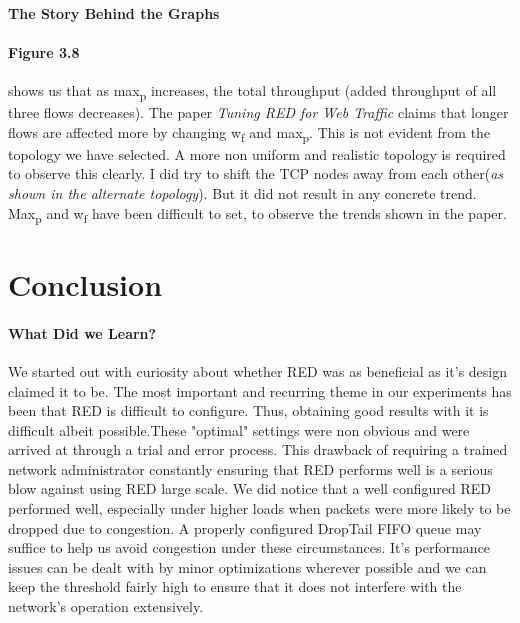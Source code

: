 \documentclass[paper=a4, fontsize=12pt]{scrartcl} %
\numberwithin{equation}{section} %
\numberwithin{figure}{section} %
\numberwithin{table}{section} %
\begin{document}
\paragraph{The Story Behind the Graphs} 
\paragraph{Figure 3.8}
\hspace{-10pt} shows us that as max\textsubscript{p} increases, the total throughput (added throughput of all three flows decreases). The paper \emph{Tuning RED for Web Traffic} claims that longer flows are affected more by changing w\textsubscript{f} and max\textsubscript{p}. This is not evident from the topology we have selected. A more non uniform and realistic topology is required to observe this clearly. I did try to shift the TCP nodes away from each other(\emph{as shown in the alternate topology}). But it did not result in any concrete trend. Max\textsubscript{p} and w\textsubscript{f} have been difficult to set, to observe the trends shown in the paper.

 \newpage
\section{Conclusion}

\paragraph{What Did we Learn?\newline\newline}
\hspace{-10pt}
We started out with curiosity about whether RED was as beneficial as it's design claimed it to be. The most important and recurring theme in our experiments has been that RED is difficult to configure. Thus, obtaining good results with it is difficult albeit possible.These "optimal" settings were non obvious and were arrived at through a trial and error process. This drawback of requiring a trained network administrator constantly ensuring that RED performs well is a serious blow against using RED large scale. We did notice that a well configured RED performed well, especially under higher loads when packets were more likely to be dropped due to congestion. A properly configured DropTail FIFO queue may suffice to help us avoid congestion under these circumstances. It's performance issues can be dealt with by minor optimizations wherever possible and we can keep the threshold fairly high to ensure that it does not interfere with the network's operation extensively.
\end{document}
